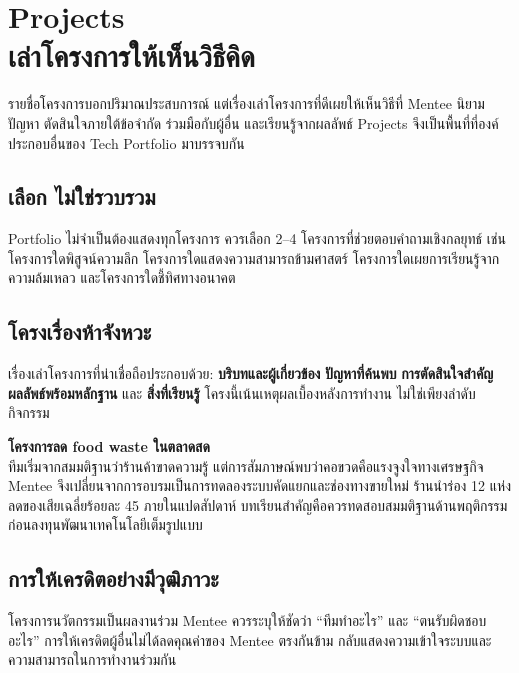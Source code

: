 \chapter{Projects\\เล่าโครงการให้เห็นวิธีคิด}

รายชื่อโครงการบอกปริมาณประสบการณ์ แต่เรื่องเล่าโครงการที่ดีเผยให้เห็นวิธีที่ Mentee นิยามปัญหา ตัดสินใจภายใต้ข้อจำกัด ร่วมมือกับผู้อื่น และเรียนรู้จากผลลัพธ์ Projects จึงเป็นพื้นที่ที่องค์ประกอบอื่นของ Tech Portfolio มาบรรจบกัน


\section{เลือก ไม่ใช่รวบรวม}
Portfolio ไม่จำเป็นต้องแสดงทุกโครงการ ควรเลือก 2--4 โครงการที่ช่วยตอบคำถามเชิงกลยุทธ์ เช่น โครงการใดพิสูจน์ความลึก โครงการใดแสดงความสามารถข้ามศาสตร์ โครงการใดเผยการเรียนรู้จากความล้มเหลว และโครงการใดชี้ทิศทางอนาคต

\section{โครงเรื่องห้าจังหวะ}
เรื่องเล่าโครงการที่น่าเชื่อถือประกอบด้วย: \textbf{บริบทและผู้เกี่ยวข้อง} \textbf{ปัญหาที่ค้นพบ} \textbf{การตัดสินใจสำคัญ} \textbf{ผลลัพธ์พร้อมหลักฐาน} และ \textbf{สิ่งที่เรียนรู้} โครงนี้เน้นเหตุผลเบื้องหลังการทำงาน ไม่ใช่เพียงลำดับกิจกรรม

\begin{examplebox}
\textbf{โครงการลด food waste ในตลาดสด}\\
ทีมเริ่มจากสมมติฐานว่าร้านค้าขาดความรู้ แต่การสัมภาษณ์พบว่าคอขวดคือแรงจูงใจทางเศรษฐกิจ Mentee จึงเปลี่ยนจากการอบรมเป็นการทดลองระบบคัดแยกและช่องทางขายใหม่ ร้านนำร่อง 12 แห่งลดของเสียเฉลี่ยร้อยละ 45 ภายในแปดสัปดาห์ บทเรียนสำคัญคือควรทดสอบสมมติฐานด้านพฤติกรรมก่อนลงทุนพัฒนาเทคโนโลยีเต็มรูปแบบ
\end{examplebox}

\section{การให้เครดิตอย่างมีวุฒิภาวะ}
โครงการนวัตกรรมเป็นผลงานร่วม Mentee ควรระบุให้ชัดว่า \enquote{ทีมทำอะไร} และ \enquote{ตนรับผิดชอบอะไร} การให้เครดิตผู้อื่นไม่ได้ลดคุณค่าของ Mentee ตรงกันข้าม กลับแสดงความเข้าใจระบบและความสามารถในการทำงานร่วมกัน

